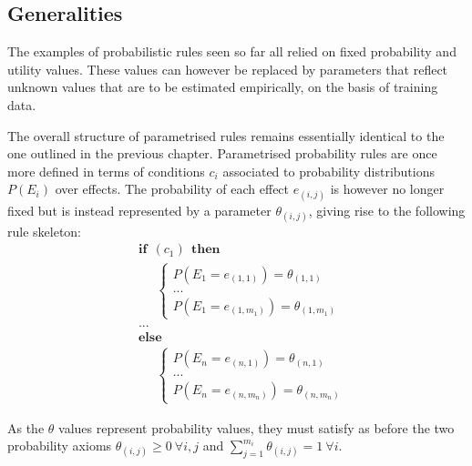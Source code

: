 \subsection{Generalities}

The examples of probabilistic rules seen so far all relied on fixed probability and utility values. These values can however be replaced by parameters that reflect unknown values that are to be estimated empirically, on the basis of training data. 
 
The overall structure of parametrised rules remains essentially identical to the one outlined in the previous chapter.  Parametrised probability rules are once more defined in terms of conditions $c_i$ associated to probability distributions $P(E_i)$ over effects.  The probability of each effect $e_{(i,j)}$ is however no longer fixed but is instead represented by a parameter $\theta_{(i,j)}$, giving rise to the following rule skeleton: 
\begin{equation}
\begin{aligned}
& \textbf{if} \ \ (c_{1}) \ \ \textbf{then} \\ 
& \;\;\;\;\; \begin{cases}
P(E_1\!=\!e_{(1,1)}) = \theta_{(1,1)} \\
 ... \\
P(E_1\!=\!e_{(1,m_1)}) = \theta_{(1,m_1)} 
\end{cases} \\[3mm]
& ...  \\
& \textbf{else} \\
& \;\;\;\;\; \begin{cases}
P(E_{n}\!=\!e_{(n,1)}) = \theta_{(n,1)} \\
... \\
P(E_{n}\!=\!e_{(n,m_n)}) = \theta_{(n,m_n)}
\end{cases}
\end{aligned}
\label{eq:probrule}
\end{equation}

As the $\theta$ values represent probability values, they must satisfy as before the two probability axioms $\theta_{(i,j)} \geq 0  \ \forall i,j$ and $\sum_{j = 1}^{m_i} \theta_{(i,j)} = 1 \ \forall i$.

